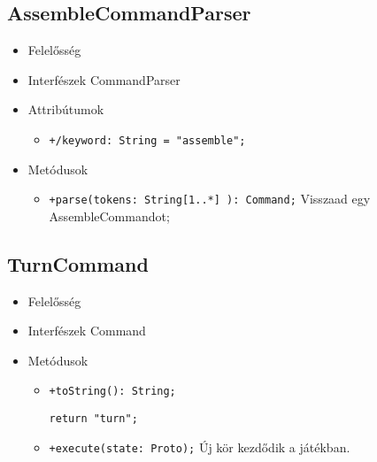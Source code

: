 \subsection{AssembleCommandParser}
\begin{itemize}
\item Felelősség\newline
\item Interfészek\newline
CommandParser
\item Attribútumok
	\begin{itemize}
		\item \texttt{+/keyword: String = "assemble";}
	\end{itemize}
\item Metódusok
\begin{itemize}
		\item \texttt{+parse(tokens: String[1..*] ): Command;} \newline
		Visszaad egy AssembleCommandot;
	\end{itemize}
\end{itemize}

\subsection{TurnCommand}
\begin{itemize}
\item Felelősség\newline
\item Interfészek\newline
Command
\item Metódusok
\begin{itemize}
		\item \texttt{+toString(): String;}
		\begin{lstlisting}
return "turn";
		\end{lstlisting}
		\item \texttt{+execute(state: Proto);} \newline
		Új kör kezdődik a játékban.
	\end{itemize}
\end{itemize}

